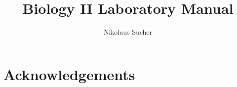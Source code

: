 \documentclass[]{book}
\title{Biology II Laboratory Manual}
\author{Nikolaus Sucher}
\date{}
\theoremstyle{definition}
\theoremstyle{definition}
\theoremstyle{definition}
\theoremstyle{remark}
\begin{document}
\frontmatter



\maketitle

{
\setcounter{tocdepth}{1}
\tableofcontents
}
\clearpage

\listoffigures
\listoftables

\chapter*{Acknowledgements}\label{acknowledgements}
\end{document}
